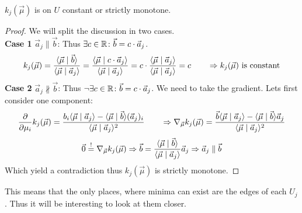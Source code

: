 \begin{lemma}
    $k_j(\vec\mu)$ is on $U$ constant or strictly monotone.
\end{lemma}
\begin{proof}
    We will split the discussion in two cases.\\
    \textbf{Case 1} $\vec a_j \parallel \vec b$: Thus $\exists c \in \mathbb{R}\colon \vec b = c \cdot \vec a_j$.
    $$k_j(\vec \mu) = \frac{\langle \vec \mu \mid \vec b \rangle}{\langle \vec \mu \mid \vec a_j \rangle} = \frac{\langle \vec \mu \mid c \cdot \vec a_j \rangle}{\langle \vec \mu \mid \vec a_j \rangle} = c \cdot \frac{\langle \vec \mu \mid \vec a_j \rangle}{\langle \vec \mu \mid \vec a_j \rangle} = c \qquad\Rightarrow k_j(\vec \mu)\textrm{ is constant}$$
    \textbf{Case 2} $\vec a_j \nparallel \vec b$: Thus $\lnot\exists c \in \mathbb{R}\colon \vec b = c \cdot \vec a_j$. We need to take the gradient. Lets first consider one component:
    $$\frac{\partial}{\partial \mu_i} k_j(\vec \mu) = \frac{b_i\langle \vec\mu \mid \vec a_j \rangle - \langle \vec\mu \mid \vec b \rangle(\vec a_j)_i}{\langle \vec\mu \mid \vec a_j \rangle^2} \qquad \Rightarrow \nabla_{\vec\mu} k_j(\vec\mu) = \frac{\vec b\langle \vec\mu \mid \vec a_j \rangle - \langle \vec\mu \mid \vec b \rangle\vec a_j}{\langle \vec\mu \mid \vec a_j \rangle^2}$$
    $$\vec 0 \stackrel{!}{=} \nabla_{\vec\mu} k_j(\vec\mu) \Rightarrow \vec b = \frac{\langle \vec \mu \mid \vec b \rangle}{\langle \vec \mu \mid \vec a_j \rangle}\vec a_j \Rightarrow \vec{a}_j \parallel \vec b$$
    Which yield a contradiction thus $k_j(\vec\mu)$ is strictly monotone.
\end{proof}

This means that the only places, where minima can exist are the edges of each $U_j$. Thus it will be interesting to look at them closer.

